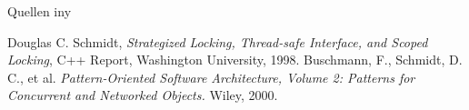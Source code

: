 \documentclass[aspectratio=169,10pt]{beamer}
\begin{document}
\begin{frame}[allowframebreaks]{Quellen}
  	iny
  \begin{thebibliography}{9}
    Douglas C. Schmidt,
    \emph{Strategized Locking, Thread-safe Interface, and Scoped Locking},
    C++ Report, Washington University, 1998.
    Buschmann, F., Schmidt, D. C., et al.
    \emph{Pattern-Oriented Software Architecture, Volume 2: Patterns for Concurrent and Networked Objects.}
    Wiley, 2000.
  \end{thebibliography}
\end{frame}
\end{document}
